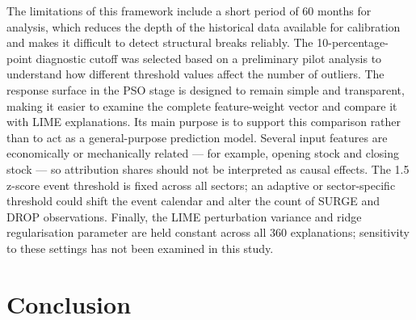 \documentclass[pdftex,sn-mathphys-num]{sn-jnl}
\begin{document}
The limitations of this framework include a short period of 60 months for analysis, which reduces the depth of the historical data available for calibration and makes it difficult to detect structural breaks reliably.  The 10-percentage-point diagnostic cutoff was selected based on a preliminary pilot analysis to understand how different threshold values affect the number of outliers. The response surface in the PSO stage is designed to remain simple and transparent, making it easier to examine the complete feature-weight vector and compare it with LIME explanations. Its main purpose is to support this comparison rather than to act as a general-purpose prediction model. Several input features are economically or mechanically related — for example, opening stock and closing stock — so attribution shares should not be interpreted as causal effects. The 1.5 z-score event threshold is fixed across all sectors; an adaptive or sector-specific threshold could shift the event calendar and alter the count of SURGE and DROP observations. Finally, the LIME perturbation variance and ridge regularisation parameter are held constant across all 360 explanations; sensitivity to these settings has not been examined in this study.

\section{Conclusion}
\end{document}
